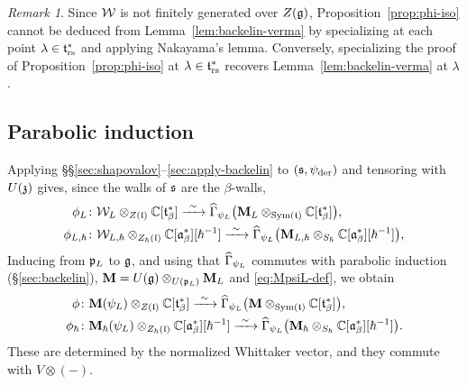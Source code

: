 \documentclass{article}
\theoremstyle{plain}
\theoremstyle{definition}
\theoremstyle{remark}
\newtheorem{remark}[theorem]{Remark}
\numberwithin{equation}{section}
\begin{document}
\begin{remark}
Since $\mathcal{W}$ is not finitely generated over $Z(\mathfrak{g})$, Proposition~\ref{prop:phi-iso} cannot be deduced from Lemma~\ref{lem:backelin-verma} by specializing at each point $\lambda\in\mathfrak{t}^*_{\mathrm{rs}}$ and applying Nakayama's lemma. Conversely, specializing the proof of Proposition~\ref{prop:phi-iso} at $\lambda\in\mathfrak{t}^*_{\mathrm{rs}}$ recovers Lemma~\ref{lem:backelin-verma} at $\lambda$.
\end{remark}

\subsection{Parabolic induction}\label{sec:case2-iso}
Applying \S\S\ref{sec:shapovalov}--\ref{sec:apply-backelin} to $(\mathfrak{s},\psi_{\mathrm{der}})$ and tensoring with $U(\mathfrak{z})$ gives, since the walls of $\mathfrak{s}$ are the $\beta$-walls,
\begin{align}
\phi_L&\colon\calW_L\otimes_{Z(\frakl)}\bbC[\frakt^*_\beta]\xrightarrow{\ \sim\ }\widehat\Gamma_{\psiL}\bigl(\bM_L\otimes_{\SymAlg(\frakt)}\bbC[\frakt^*_\beta]\bigr),\label{eq:phiL}\\
\phi_{L,\hbar}&\colon\calW_{L,\hbar}\otimes_{\Zh(\frakl)}\Cbe[\hbar^{-1}]\xrightarrow{\ \sim\ }\widehat\Gamma_{\psiL}\bigl(\bM_{L,\hbar}\otimes_{\Sh}\Cbe[\hbar^{-1}]\bigr),\label{eq:phiLh}
\end{align}
Inducing from $\mathfrak{p}_L$ to $\mathfrak{g}$, and using that $\widehat\Gamma_{\psi_L}$ commutes with parabolic induction (\S\ref{sec:backelin}), $\mathbf{M}=U(\mathfrak{g})\otimes_{U(\mathfrak{p}_L)}\mathbf{M}_L$ and \eqref{eq:MpsiL-def}, we obtain
\begin{align}
\phi&\colon\bM(\psiL)\otimes_{Z(\frakl)}\bbC[\frakt^*_\beta]\xrightarrow{\ \sim\ }\widehat\Gamma_{\psiL}\bigl(\bM\otimes_{\SymAlg(\frakt)}\bbC[\frakt^*_\beta]\bigr),\label{eq:phi-G}\\
\phi_\hbar&\colon\bM_\hbar(\psiL)\otimes_{\Zh(\frakl)}\Cbe[\hbar^{-1}]\xrightarrow{\ \sim\ }\widehat\Gamma_{\psiL}\bigl(\bM_\hbar\otimes_{\Sh}\Cbe[\hbar^{-1}]\bigr).\label{eq:phi-Gh}
\end{align}
These are determined by the normalized Whittaker vector, and they commute with $V\otimes(-)$.
\end{document}
